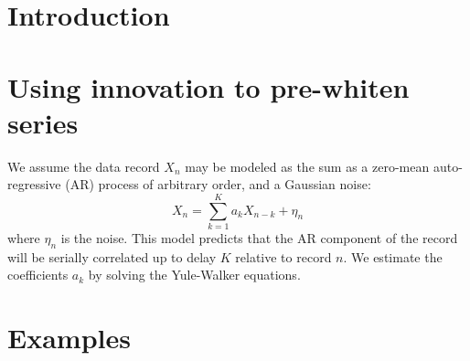 %
\section{Introduction}

\section{Using innovation to pre-whiten series}
We assume the data record
$X_n$
may be modeled as 
the sum as a zero-mean auto-regressive (AR) process of
arbitrary order, and
a Gaussian noise:
\begin{equation}
X_n = \sum^{K}_{k=1} a_k X_{n-k} + \eta_n
\end{equation}
where $\eta_n$ is the noise.
This model predicts that the AR component of the record 
will be serially correlated 
up to delay $K$ relative to record $n$.
We estimate 
the coefficients $a_k$ 
by solving
the Yule-Walker equations.

\section{Examples}
\label{}



